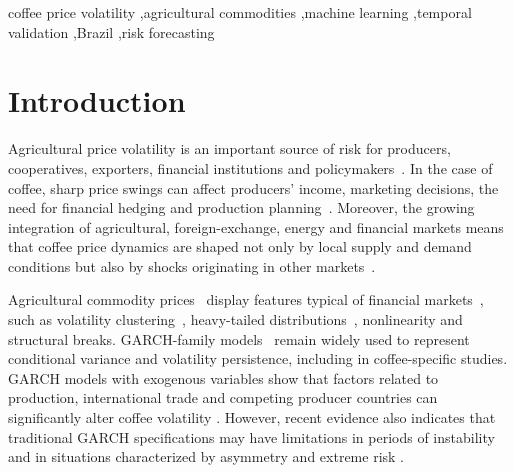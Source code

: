 \documentclass[a4paper,fleqn]{cas-sc}
\begin{document}
\begin{keywords}
coffee price volatility \sep agricultural commodities \sep machine learning \sep temporal validation \sep Brazil \sep risk forecasting
\end{keywords}

\maketitle

\section{Introduction}
\label{sec:introduction}

Agricultural price volatility is an important source of risk for producers, cooperatives, exporters, financial institutions and policymakers~\citep{Manogna2025HybridVolatility,Brun2026GARCHCoffeeRisk}. In the case of coffee, sharp price swings can affect producers' income, marketing decisions, the need for financial hedging and production planning~\citep{Zhang2025ClimateRealizedVolatility,Chaovanapoonphol2023CoffeeGARCHX,Fahmi2023LocalCoffeePolicy}. Moreover, the growing integration of agricultural, foreign-exchange, energy and financial markets means that coffee price dynamics are shaped not only by local supply and demand conditions but also by shocks originating in other markets~\citep{Nassani2025FinancialIntegration,manogna2025dynamicnexus}.

Agricultural commodity prices~\citep{hamulczuk2026price,Manogna2025HybridVolatility,Jin2026,kupabado2025price,martin2015finance} display features typical of financial markets~\citep{105033937791}, such as volatility clustering~\citep{S259000562600007X}, heavy-tailed distributions~\citep{S0957417426013771}, nonlinearity and structural breaks. GARCH-family models~\citep{S0165188925000946,105013192554,105027925489} remain widely used to represent conditional variance and volatility persistence, including in coffee-specific studies. GARCH models with exogenous variables show that factors related to production, international trade and competing producer countries can significantly alter coffee volatility \citep{Chaovanapoonphol2023CoffeeGARCHX}. However, recent evidence also indicates that traditional GARCH specifications may have limitations in periods of instability and in situations characterized by asymmetry and extreme risk \citep{Brun2026GARCHCoffeeRisk}.
\end{document}
